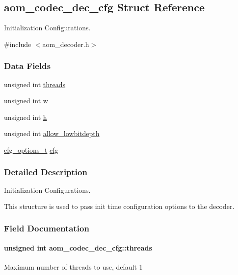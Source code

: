 \hypertarget{structaom__codec__dec__cfg}{}\subsection{aom\+\_\+codec\+\_\+dec\+\_\+cfg Struct Reference}
\label{structaom__codec__dec__cfg}


Initialization Configurations.  




{\ttfamily \#include $<$aom\+\_\+decoder.\+h$>$}

\subsubsection*{Data Fields}
\begin{DoxyCompactItemize}
\item 
unsigned int \hyperlink{structaom__codec__dec__cfg_a48c68337e1071e2aee36c649e579f189}{threads}
\item 
unsigned int \hyperlink{structaom__codec__dec__cfg_a107d66882f85eaaee59e59ea23d974d6}{w}
\item 
unsigned int \hyperlink{structaom__codec__dec__cfg_a441611a22188289243eafa7df433e85f}{h}
\item 
unsigned int \hyperlink{structaom__codec__dec__cfg_afe4d704d679b943d566dcd4fd2276851}{allow\+\_\+lowbitdepth}
\item 
\hyperlink{group__codec_ga58cddec4492c70945a2b4c3773c665b0}{cfg\+\_\+options\+\_\+t} \hyperlink{structaom__codec__dec__cfg_ae47ad67c30783b231e16eee32f573e1d}{cfg}
\end{DoxyCompactItemize}


\subsubsection{Detailed Description}
Initialization Configurations. 

This structure is used to pass init time configuration options to the decoder. 

\subsubsection{Field Documentation}
\paragraph[{\texorpdfstring{threads}{threads}}]{\setlength{\rightskip}{0pt plus 5cm}unsigned int aom\+\_\+codec\+\_\+dec\+\_\+cfg\+::threads}\hypertarget{structaom__codec__dec__cfg_a48c68337e1071e2aee36c649e579f189}{}\label{structaom__codec__dec__cfg_a48c68337e1071e2aee36c649e579f189}
Maximum number of threads to use, default 1 
